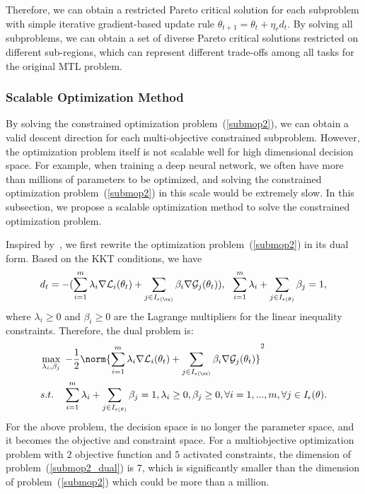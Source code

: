 Therefore, we can obtain a restricted Pareto critical solution for each subproblem with simple iterative gradient-based update rule $\theta_{t+1} = \theta_{t} + \eta_r d_t$. By solving all subproblems, we can obtain a set of diverse Pareto critical solutions restricted on different sub-regions, which can represent different trade-offs among all tasks for the original MTL problem.

\subsubsection{Scalable Optimization Method}
By solving the constrained optimization problem~(\ref{submop2}), we can obtain a valid descent direction for each multi-objective constrained subproblem. However, the optimization problem itself is not scalable well for high dimensional decision space. For example, when training a deep neural network, we often have more than millions of parameters to be optimized, and solving the constrained optimization problem~(\ref{submop2}) in this scale would be extremely slow. In this subsection, we propose a scalable optimization method to solve the constrained optimization problem.

Inspired by~\cite{fliege2000steepest}, we first rewrite the optimization problem~(\ref{submop2}) in its dual form. Based on the KKT conditions, we have
\begin{eqnarray}
    \label{submop2_KKT}
         d_t = - (\sum_{i=1}^{m} \lambda_i \nabla \mathcal{L}_i(\theta_t) +  \sum_{j \in I_{\epsilon(\vx)}} \beta_i \nabla \mathcal{G}_j(\theta_t)), ~~\sum_{i=1}^{m} \lambda_i + \sum_{j \in I_{\epsilon(\theta)}} \beta_j = 1,
\end{eqnarray}
where $\lambda_i \geq 0$ and $\beta_i \geq 0$ are the Lagrange multipliers for the linear inequality constraints. Therefore, the dual problem is:
\begin{eqnarray}
    \label{submop2_dual}
    \begin{aligned}
        &\max_{\lambda_i,\beta_j}~ -\frac{1}{2}\norm{\sum_{i=1}^{m} \lambda_i \nabla \mathcal{L}_i(\theta_t) +  \sum_{j \in I_{\epsilon(\vx)}} \beta_i \nabla \mathcal{G}_j(\theta_t)}^2 \\
        & s.t.~~~ \sum_{i=1}^{m} \lambda_i + \sum_{j \in I_{\epsilon(\theta)}} \beta_j = 1,  \lambda_i \geq 0, \beta_j \geq 0, \forall i = 1,...,m, \forall j \in I_{\epsilon}(\theta).
    \end{aligned}
\end{eqnarray}
For the above problem, the decision space is no longer the parameter space, and it becomes the objective and constraint space. For a multiobjective optimization problem with $2$ objective function and $5$ activated constraints, the dimension of problem~(\ref{submop2_dual}) is $7$, which is significantly smaller than the dimension of problem~(\ref{submop2}) which could be more than a million.

